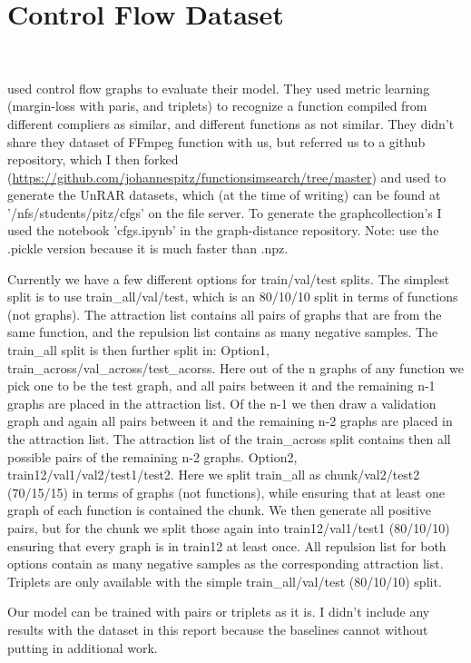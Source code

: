 \section{Control Flow Dataset}\

\cite{li2019} used control flow graphs to evaluate their model. They used metric learning (margin-loss with paris, and triplets) to recognize a function compiled from different compliers as similar, and different functions as not similar. They didn't share they dataset of FFmpeg function with us, but referred us to a github repository, which I then forked (\url{https://github.com/johannespitz/functionsimsearch/tree/master}) and used to generate the UnRAR datasets, which (at the time of writing) can be found at '/nfs/students/pitz/cfgs' on the file server. To generate the graphcollection's I used the notebook 'cfgs.ipynb' in the graph-distance repository. Note: use the .pickle version because it is much faster than .npz.

Currently we have a few different options for train/val/test splits. The simplest split is to use train\_all/val/test, which is an 80/10/10 split in terms of functions (not graphs). The attraction list contains all pairs of graphs that are from the same function, and the repulsion list contains as many negative samples. The train\_all split is then further split in: Option1, train\_across/val\_across/test\_acorss. Here out of the n graphs of any function we pick one to be the test graph, and all pairs between it and the remaining n-1 graphs are placed in the attraction list. Of the n-1 we then draw a validation graph and again all pairs between it and the remaining n-2 graphs are placed in the attraction list. The attraction list of the train\_across split contains then all possible pairs of the remaining n-2 graphs. Option2, train12/val1/val2/test1/test2. Here we split train\_all as chunk/val2/test2 (70/15/15) in terms of graphs (not functions), while ensuring that at least one graph of each function is contained the chunk. We then generate all positive pairs, but for the chunk we split those again into train12/val1/test1 (80/10/10) ensuring that every graph is in train12 at least once. All repulsion list for both options contain as many negative samples as the corresponding attraction list. Triplets are only available with the simple  train\_all/val/test (80/10/10) split.

Our model can be trained with pairs or triplets as it is. I didn't include any results with the dataset in this report because the baselines cannot without putting in additional work.
